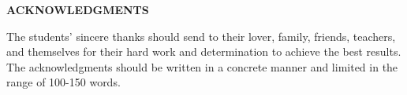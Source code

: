 \documentclass[../Main.tex]{subfiles}
\begin{document}
\begin{center}
    \Large{\textbf{ACKNOWLEDGMENTS}}\\
\end{center}
\vspace{1cm}
The students' sincere thanks should send to their lover, family, friends, teachers, and themselves for their hard work and determination to achieve the best results.  The acknowledgments should be written in a concrete manner and limited in the range of 100-150 words. 
\end{document}
